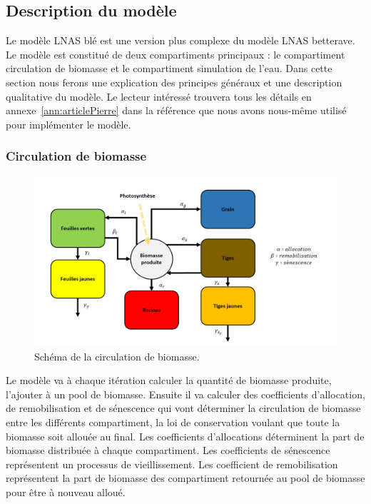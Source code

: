 \subsection{Description du modèle}

Le modèle LNAS blé est une version plus complexe du modèle LNAS betterave. Le modèle est constitué de deux compartiments principaux : le compartiment circulation de biomasse et le compartiment simulation de l'eau. Dans cette section nous ferons une explication des principes généraux et une description qualitative du modèle. Le lecteur intéressé trouvera tous les détails en annexe~\ref{ann:articlePierre} dans  la référence que nous avons nous-même utilisé pour implémenter le modèle.

\subsubsection{Circulation de biomasse}

\begin{figure}[H]

\begin{center}
 \includegraphics[scale = 0.42]{./img/modelSchema.png}
 \caption{Schéma de la circulation de biomasse.}
 \label{fig:schemaModel}
\end{center}

\end{figure}

Le modèle va à chaque itération calculer la quantité de biomasse produite, l'ajouter à un pool de biomasse. Ensuite il va calculer des coefficients d'allocation, de remobilisation et de sénescence qui vont déterminer la circulation de biomasse entre les différents compartiment, la loi de conservation voulant que toute la biomasse soit allouée au final. 
Les coefficients d'allocations déterminent la part de biomasse distribuée à chaque compartiment. Les coefficients de sénescence représentent un processus de vieillissement. Les coefficient de remobilisation représentent la part de biomasse des compartiment retournée au pool de biomasse pour être à nouveau alloué.

